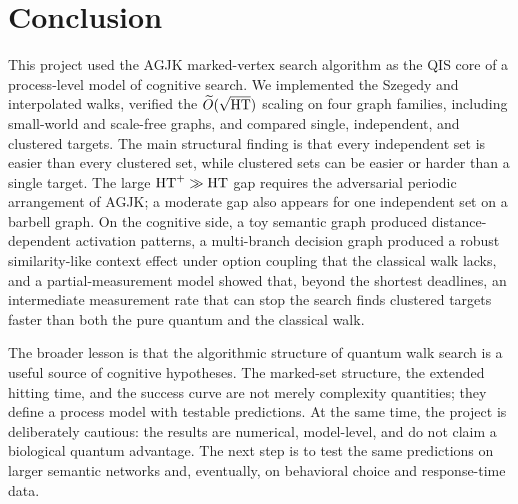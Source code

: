 \section{Conclusion}
\label{sec:conclusion}

This project used the AGJK marked-vertex search algorithm as the QIS core of a
process-level model of cognitive search. We implemented the Szegedy and
interpolated walks, verified the $\widetilde O(\sqrt{\mathrm{HT}})$ scaling on four
graph families, including small-world and scale-free graphs, and compared
single, independent, and clustered targets. The main structural finding is that
every independent set is easier than every clustered set, while clustered sets
can be easier or harder than a single target. The large $\mathrm{HT}^+\gg\mathrm{HT}$ gap
requires the adversarial periodic arrangement of AGJK; a moderate gap also
appears for one independent set on a barbell graph. On the
cognitive side, a toy semantic graph produced distance-dependent activation
patterns, a multi-branch decision graph produced a robust similarity-like
context effect under option coupling that the classical walk lacks, and a partial-measurement model showed
that, beyond the shortest deadlines, an intermediate measurement rate that can
stop the search finds clustered targets faster than both the pure quantum and
the classical walk.

The broader lesson is that the algorithmic structure of quantum walk search is
a useful source of cognitive hypotheses. The marked-set structure, the
extended hitting time, and the success curve are not merely complexity
quantities; they define a process model with testable predictions. At the same
time, the project is deliberately cautious: the results are numerical,
model-level, and do not claim a biological quantum advantage. The next step is
to test the same predictions on larger semantic networks and, eventually, on
behavioral choice and response-time data.
